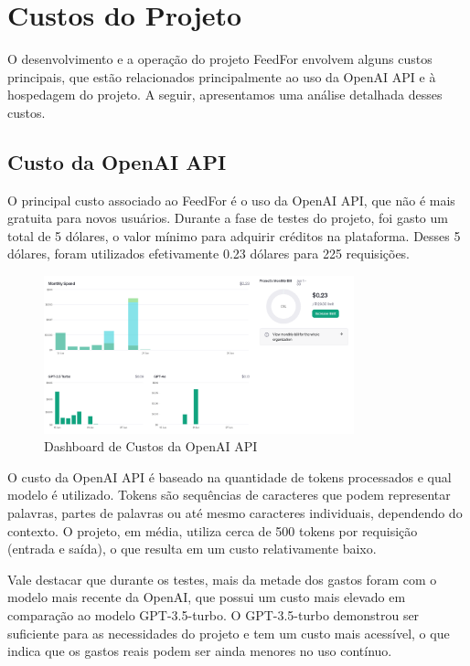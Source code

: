 \section{Custos do Projeto}

O desenvolvimento e a operação do projeto FeedFor envolvem alguns custos principais, que estão relacionados principalmente ao uso da OpenAI API e à hospedagem do projeto. A seguir, apresentamos uma análise detalhada desses custos.

\subsection{Custo da OpenAI API}

O principal custo associado ao FeedFor é o uso da OpenAI API, que não é mais gratuita para novos usuários. Durante a fase de testes do projeto, foi gasto um total de 5 dólares, o valor mínimo para adquirir créditos na plataforma. Desses 5 dólares, foram utilizados efetivamente 0.23 dólares para 225 requisições.

\begin{figure}[H]
    \centering
    \includegraphics[width=0.8\textwidth]{figuras/cost_openai.png}
    \caption{Dashboard de Custos da OpenAI API}
    \label{fig:first_phase}
\end{figure}

O custo da OpenAI API é baseado na quantidade de tokens processados e qual modelo é utilizado. Tokens são sequências de caracteres que podem representar palavras, partes de palavras ou até mesmo caracteres individuais, dependendo do contexto. O projeto, em média, utiliza cerca de 500 tokens por requisição (entrada e saída), o que resulta em um custo relativamente baixo.

Vale destacar que durante os testes, mais da metade dos gastos foram com o modelo mais recente da OpenAI, que possui um custo mais elevado em comparação ao modelo GPT-3.5-turbo. O GPT-3.5-turbo demonstrou ser suficiente para as necessidades do projeto e tem um custo mais acessível, o que indica que os gastos reais podem ser ainda menores no uso contínuo.

